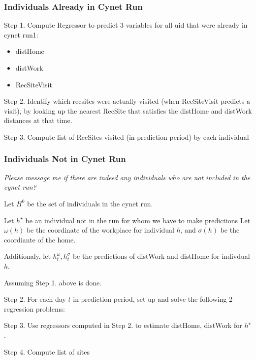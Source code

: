 \documentclass[onecolumn, compsoc,10pt]{IEEEtran}
\begin{document}
\subsubsection{Individuals Already in Cynet Run}

Step 1. Compute Regressor to predict $3$ variables for all uid that were already in cynet run1:
\begin{itemize}
\item distHome
\item distWork
\item RecSiteVisit
\end{itemize}

Step 2. Identify which recsites were actually visited (when RecSiteVisit predicts a visit), by looking up the nearest RecSite that satisfies the distHome and distWork distances at that time.

Step 3. Compute list of RecSites visited (in prediction period) by each individual

\subsubsection{Individuals Not  in Cynet Run}

\textit{Please message me if there are indeed any individuals who are not included in the cynet run? }


\def\H{H^0}
\def\hh{h^\star}

Let $H^0$ be the set of individuals in the cynet run.

Let  $h^\star$ be an individual not in the run for whom we have to make predictions
Let $\omega(h)$ be the coordinate of the workplace for individual $h$, and $\sigma(h)$ be the coordiante of the home.

Additionaly, let $h_t^\omega, h_t^\sigma$ be the predictions of distWork and distHome  for indivdual $h$.

Assuming Step 1. above is done.

Step 2. For each day $t$ in prediction period, set up and solve the following 2  
regression problems:

Step 3. Use regressors computed in Step 2. to estimate distHome, distWork for $\hh$.

Step 4. Compute list of sites 
\end{document}
